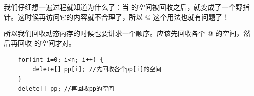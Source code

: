我们仔细想一遍过程就知道为什么了：当 \lstinline@pp@ 的空间被回收之后，\lstinline@pp@ 就变成了一个野指针。这时候再访问它的内容就不合理了，所以 \lstinline@pp[i]@ 这个用法也就有问题了！\par
所以我们回收动态内存的时候也要讲求一个顺序。应该先回收各个 \lstinline@pp[i]@ 的空间，然后再回收 \lstinline@pp@ 的空间才对。\par
\begin{lstlisting}
    for(int i=0; i<n; i++) {
        delete[] pp[i]; //先回收各个pp[i]的空间
    }
    delete[] pp; //再回收pp的空间
\end{lstlisting}\par
